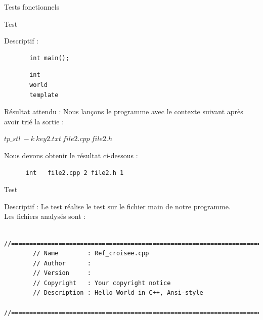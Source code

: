 \documentclass{article}
\begin{document}
\begin{section}{Tests fonctionnels}
\begin{subsection}{Test }
\begin{paragraph}{Descriptif :}
      \begin{listing}[h!]
	\begin{verbatim}
	   int main();
	\end{verbatim}
      \end{listing}
      
        \begin{listing}[h!]
	\begin{verbatim}
	   int
	   world
	   template
	\end{verbatim}
      \end{listing}
      
    \end{paragraph}
	   
    \begin{paragraph}{Résultat attendu :}
       Nous lançons le programme avec le contexte suivant après avoir trié la sortie :  
       \begin{center}
	\textbf{$tp\_stl\ -k\ key2.txt\ file2.cpp\ file2.h$}
      \end{center}
      
      Nous devons obtenir le résultat ci-dessous : 
      \begin{listing}[h!]
      \begin{verbatim}
	  int	file2.cpp 2	file2.h 1	
      \end{verbatim}
  
      \end{listing}
    \end{paragraph}

  \end{subsection}

   \newpage 
  
  \begin{subsection}{Test }
    
    \begin{paragraph}{Descriptif :}
	Le test  réalise le test sur le fichier main de notre programme.\\ Les fichiers analysés sont : 
      
      \begin{verbatim}
	    //============================================================================
	    // Name        : Ref_croisee.cpp
	    // Author      :
	    // Version     :
	    // Copyright   : Your copyright notice
	    // Description : Hello World in C++, Ansi-style
	    //============================================================================


\end{verbatim}
\end{paragraph}
\end{subsection}
\end{section}
\end{document}
